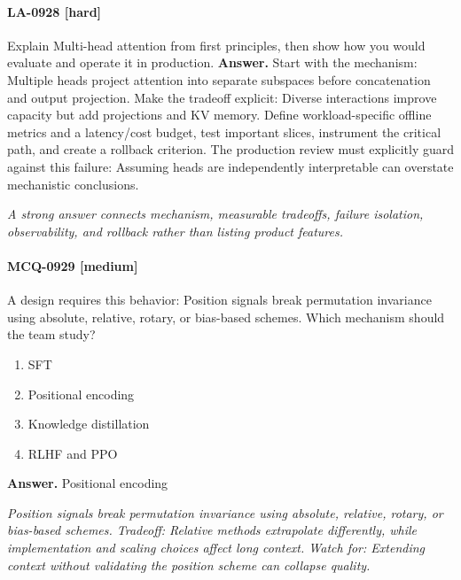 \paragraph{LA-0928 [hard]} Explain Multi-head attention from first principles, then show how you would evaluate and operate it in production.
\noindent\textbf{Answer.} Start with the mechanism: Multiple heads project attention into separate subspaces before concatenation and output projection. Make the tradeoff explicit: Diverse interactions improve capacity but add projections and KV memory. Define workload-specific offline metrics and a latency/cost budget, test important slices, instrument the critical path, and create a rollback criterion. The production review must explicitly guard against this failure: Assuming heads are independently interpretable can overstate mechanistic conclusions.
\par\textit{A strong answer connects mechanism, measurable tradeoffs, failure isolation, observability, and rollback rather than listing product features.}
\paragraph{MCQ-0929 [medium]} A design requires this behavior: Position signals break permutation invariance using absolute, relative, rotary, or bias-based schemes. Which mechanism should the team study?
\begin{enumerate}[label=\Alph*.]
\item SFT
\item Positional encoding
\item Knowledge distillation
\item RLHF and PPO
\end{enumerate}
\noindent\textbf{Answer.} Positional encoding
\par\textit{Position signals break permutation invariance using absolute, relative, rotary, or bias-based schemes. Tradeoff: Relative methods extrapolate differently, while implementation and scaling choices affect long context. Watch for: Extending context without validating the position scheme can collapse quality.}
